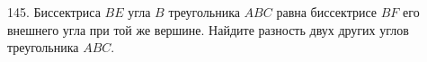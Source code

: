 145. Биссектриса $BE$ угла $B$ треугольника $ABC$ равна биссектрисе $BF$ его внешнего угла при той же вершине. Найдите разность двух других углов треугольника $ABC.$\\
